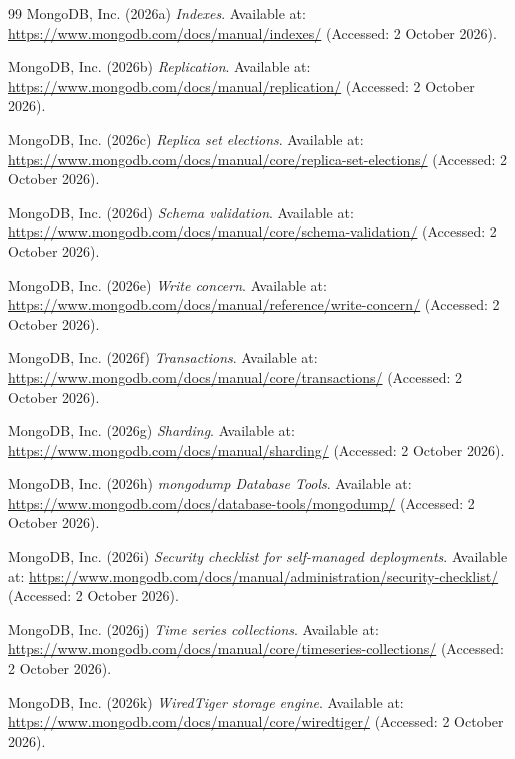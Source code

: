 \documentclass[11pt,a4paper]{article}
\begin{document}
\begin{thebibliography}{99}
 MongoDB, Inc. (2026a) \textit{Indexes}. Available at: \url{https://www.mongodb.com/docs/manual/indexes/} (Accessed: 2 October 2026).

 MongoDB, Inc. (2026b) \textit{Replication}. Available at: \url{https://www.mongodb.com/docs/manual/replication/} (Accessed: 2 October 2026).

 MongoDB, Inc. (2026c) \textit{Replica set elections}. Available at: \url{https://www.mongodb.com/docs/manual/core/replica-set-elections/} (Accessed: 2 October 2026).

 MongoDB, Inc. (2026d) \textit{Schema validation}. Available at: \url{https://www.mongodb.com/docs/manual/core/schema-validation/} (Accessed: 2 October 2026).

 MongoDB, Inc. (2026e) \textit{Write concern}. Available at: \url{https://www.mongodb.com/docs/manual/reference/write-concern/} (Accessed: 2 October 2026).

 MongoDB, Inc. (2026f) \textit{Transactions}. Available at: \url{https://www.mongodb.com/docs/manual/core/transactions/} (Accessed: 2 October 2026).

 MongoDB, Inc. (2026g) \textit{Sharding}. Available at: \url{https://www.mongodb.com/docs/manual/sharding/} (Accessed: 2 October 2026).

 MongoDB, Inc. (2026h) \textit{mongodump Database Tools}. Available at: \url{https://www.mongodb.com/docs/database-tools/mongodump/} (Accessed: 2 October 2026).

 MongoDB, Inc. (2026i) \textit{Security checklist for self-managed deployments}. Available at: \url{https://www.mongodb.com/docs/manual/administration/security-checklist/} (Accessed: 2 October 2026).

 MongoDB, Inc. (2026j) \textit{Time series collections}. Available at: \url{https://www.mongodb.com/docs/manual/core/timeseries-collections/} (Accessed: 2 October 2026).

 MongoDB, Inc. (2026k) \textit{WiredTiger storage engine}. Available at: \url{https://www.mongodb.com/docs/manual/core/wiredtiger/} (Accessed: 2 October 2026).


\end{thebibliography}
\end{document}
